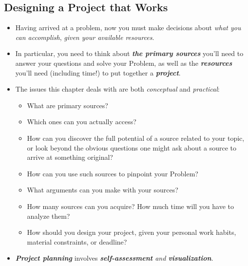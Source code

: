 \documentclass[11pt]{article}
\begin{document}
\subsection{Designing a Project that Works}
\begin{itemize}
\item Having arrived at a problem, now you must make decisions about \emph{what you can accomplish}, \emph{given your available resources}. 

\item In particular, you need to think about \emph{\textbf{the primary sources}} you’ll need to answer your questions and solve your Problem, as well as the \emph{\textbf{resources}} you’ll need (including time!) to put together a \emph{\textbf{project}}.

\item The issues this chapter deals with are both \emph{conceptual} and \emph{practical}: 
\begin{itemize}
\item What are primary sources? 

\item Which ones can you actually access?

\item How can you discover the full potential of a source related to your topic, or look beyond the obvious questions one might ask about a source to arrive at something original? 

\item How can you use such sources to pinpoint your Problem?

\item What arguments can you make with your sources?

\item How many sources can you acquire? How much time will you have to analyze them?

\item How should you design your project, given your personal work habits, material constraints, or deadline?
\end{itemize}

\item \emph{\textbf{Project planning}} involves \emph{\textbf{self-assessment} and \textbf{visualization}}. 
\end{itemize}
\end{document}
